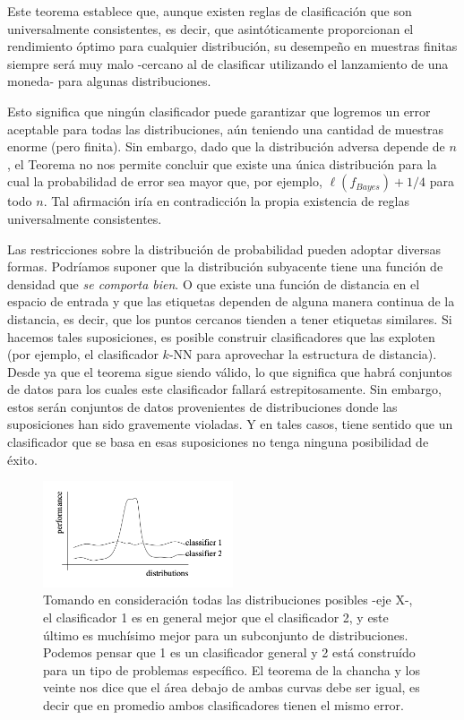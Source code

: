 \documentclass{article}
\begin{document}
Este teorema establece que, aunque existen reglas de clasificación que son universalmente 
consistentes, es decir, que asintóticamente proporcionan el rendimiento óptimo para cualquier 
distribución, su desempeño en muestras finitas siempre será muy malo -cercano al de clasificar utilizando el lanzamiento de una moneda- para algunas 
distribuciones. \newline

Esto significa que ningún clasificador puede garantizar que logremos un error aceptable 
para todas las distribuciones, aún teniendo una cantidad de muestras enorme (pero finita). 
Sin embargo, dado que la distribución adversa depende de \(n\), 
el Teorema no nos permite concluir que existe una única distribución para la cual la 
probabilidad de error sea mayor que, por ejemplo, \(\ell(f_{Bayes}) + 1/4\) para todo \(n\). Tal afirmación 
iría en contradicción la propia existencia de reglas universalmente consistentes. \newline


Las restricciones sobre la distribución de probabilidad pueden adoptar diversas formas. Podríamos suponer que la distribución 
subyacente tiene una función de densidad que \textit{se comporta bien}. O
que existe una función de distancia en el espacio de entrada y que las etiquetas dependen de alguna manera 
continua de la distancia, es decir, que los puntos cercanos tienden a tener etiquetas similares. Si 
hacemos tales suposiciones, es posible construir clasificadores que las exploten (por ejemplo, el clasificador 
\(k\)-NN para aprovechar la estructura de distancia). Desde ya que el teorema sigue siendo válido, lo que significa que habrá conjuntos de datos 
para los cuales este clasificador fallará estrepitosamente. Sin embargo, estos serán conjuntos de datos 
provenientes de distribuciones donde las suposiciones han sido gravemente violadas. Y en tales casos, tiene 
sentido que un clasificador que se basa en esas suposiciones no tenga ninguna posibilidad de éxito.

\begin{figure}[ht!]
    \centering
    \includegraphics[width=0.5\textwidth]{Images/7.png}
    \caption{Tomando en consideración todas las distribuciones posibles -eje X-, el clasificador 1
    es en general mejor que el clasificador 2, y este último es muchísimo mejor para un subconjunto
    de distribuciones. Podemos pensar que 1 es un clasificador general y 2 está construído para un tipo
    de problemas específico. El teorema de la chancha y los veinte nos dice que el área debajo de ambas
    curvas debe ser igual, es decir que en promedio ambos clasificadores tienen el mismo error.}
    \label{fig:no_free_lunch_theorem}
\end{figure}
\end{document}
